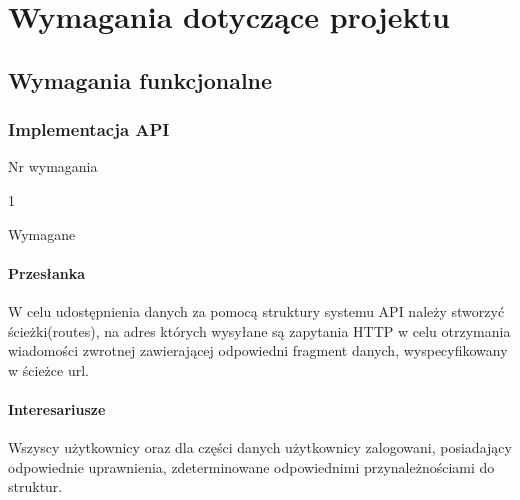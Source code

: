 \documentclass[eng,printmode]{mgr}
\begin{document}
\chapter{Wymagania dotyczące projektu}

\section{Wymagania funkcjonalne}

\subsection{Implementacja API}
\begin{labeling}{Nr wymagania}
\item [Nr wymagania:] 1
\item [Priorytet:] Wymagane
\end{labeling}

\subsubsection{Przesłanka}
W celu udostępnienia danych za pomocą struktury systemu API należy stworzyć ścieżki(routes), na adres których wysyłane są zapytania HTTP w celu otrzymania wiadomości zwrotnej zawierającej odpowiedni fragment danych, wyspecyfikowany w ścieżce url.

\subsubsection{Interesariusze}
Wszyscy użytkownicy oraz dla części danych użytkownicy zalogowani, posiadający odpowiednie uprawnienia, zdeterminowane odpowiednimi przynależnościami do struktur.
\end{document}
